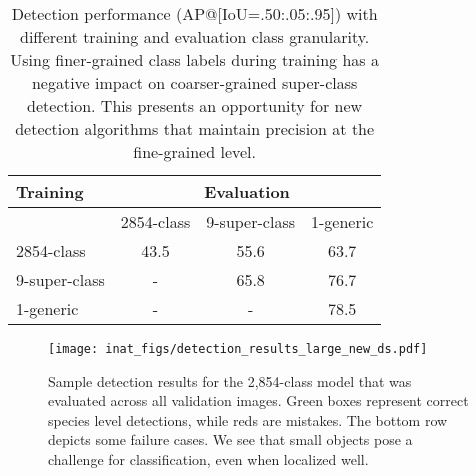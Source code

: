 \documentclass[10pt,twocolumn,letterpaper]{article}
\begin{document}
\begin{table}[t]
\small
\begin{center}
\begin{tabular}{ |l|c|c|c| } 
 \hline
 {\bf Training} & \multicolumn{3}{c|}{\bf Evaluation} \\ \hline
                  & 2854-class & 9-super-class & 1-generic \\ \hline
 2854-class       & 43.5    & 55.6 & 63.7 \\ 
 9-super-class    & -       & 65.8 & 76.7 \\ 
 1-generic        & -       & -    & 78.5 \\ \hline
\end{tabular}
\end{center}
\caption{Detection performance (AP@[IoU=.50:.05:.95]) with different training and evaluation class granularity. Using finer-grained class labels during training has a negative impact on coarser-grained super-class detection. This presents an opportunity for new detection algorithms that maintain precision at the fine-grained level.}
\label{tab:coco_ap}
\end{table}

\begin{figure*}[h!]
\centering
\texttt{[image: inat\_figs/detection\_results\_large\_new\_ds.pdf]}
\caption{Sample detection results for the 2,854-class model that was evaluated across all validation images. Green boxes represent correct species level detections, while reds are mistakes. 
The bottom row depicts some failure cases. We see that small objects pose a challenge for classification, even when localized well.} 
\label{fig:detection_results}
\end{figure*}
\end{document}
